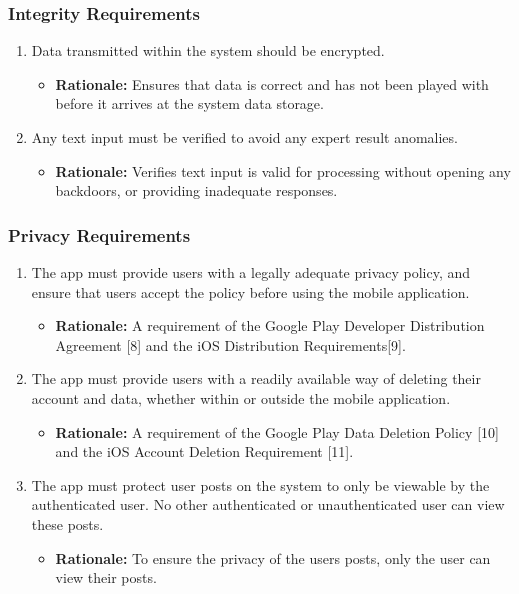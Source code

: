 \documentclass[]{article}
\begin{document}
\subsubsection{Integrity Requirements}
\label{ssub:integrity_requirements}
\begin{enumerate}[{SR-INT}1. ]
\item Data transmitted within the system should be encrypted.
    \begin{itemize}
        \item \textbf{Rationale:} Ensures that data is correct and has not been played with before it arrives at the system data storage.
    \end{itemize}

\item Any text input must be verified to avoid any expert result anomalies.
    \begin{itemize}
        \item \textbf{Rationale:} Verifies text input is valid for processing without opening any backdoors, or providing inadequate responses.
    \end{itemize}
\end{enumerate}

\subsubsection{Privacy Requirements}
\label{ssub:privacy_requirements}
\begin{enumerate}[{SR-P}1. ]
\item The app must provide users with a legally adequate privacy policy, and ensure that users accept the policy before using the mobile application.
    \begin{itemize}
        \item \textbf{Rationale:} A requirement of the Google Play Developer Distribution Agreement [8] and the iOS Distribution Requirements[9].
    \end{itemize}

\item The app must provide users with a readily available way of deleting their account and data, whether within or outside the mobile application.
    \begin{itemize}
        \item \textbf{Rationale:} A requirement of the Google Play Data Deletion Policy [10] and the iOS Account Deletion Requirement [11].
    \end{itemize}

\item The app must protect user posts on the system to only be viewable by the authenticated user. No other authenticated or unauthenticated user can view these posts.
    \begin{itemize}
        \item \textbf{Rationale:} To ensure the privacy of the users posts, only the user can view their posts.
    \end{itemize}
\end{enumerate}
\end{document}
